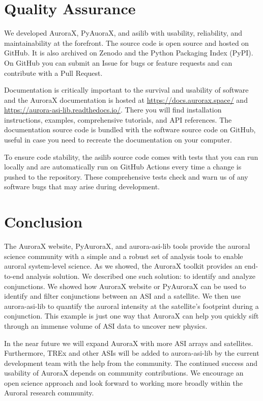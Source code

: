 \documentclass[utf8]{FrontiersinHarvard} %
\begin{document}
\section{Quality Assurance}
We developed AuroraX, PyAuoraX, and asilib with usability, reliability, and maintainability at the forefront. The source code is open source and hosted on GitHub. It is also archived on Zenodo and the Python Packaging Index (PyPI). On GitHub you can submit an Issue for bugs or feature requests and can contribute with a Pull Request.  

Documentation is critically important to the survival and usability of software and the AuroraX documentation is hosted at \url{https://docs.aurorax.space/} and \url{https://aurora-asi-lib.readthedocs.io/}. There you will find installation instructions, examples, comprehensive tutorials, and API references. The documentation source code is bundled with the software source code on GitHub, useful in case you need to recreate the documentation on your computer.

To ensure code stability, the asilib source code comes with tests that you can run locally and are automatically run on GitHub Actions every time a change is pushed to the repository. These comprehensive tests check and warn us of any software bugs that may arise during development.

\section{Conclusion}

The AuroraX website, PyAuroraX, and aurora-asi-lib tools provide the auroral science community with a simple and a robust set of analysis tools to enable auroral system-level science. As we showed, the AuroraX toolkit provides an end-to-end analysis solution. We described one such solution: to identify and analyze conjunctions. We showed how AuroraX website or PyAuroraX can be used to identify and filter conjunctions between an ASI and a satellite. We then use aurora-asi-lib to quantify the auroral intensity at the satellite's footprint during a conjunction. This example is just one way that AuroraX can help you quickly sift through an immense volume of ASI data to uncover new physics.

In the near future we will expand AuroraX with more ASI arrays and satellites. Furthermore, TREx and other ASIs will be added to aurora-asi-lib by the current development team with the help from the community. The continued success and usability of AuroraX depends on community contributions. We encourage an open science approach and look forward to working more broadly within the Auroral research community.
\end{document}
